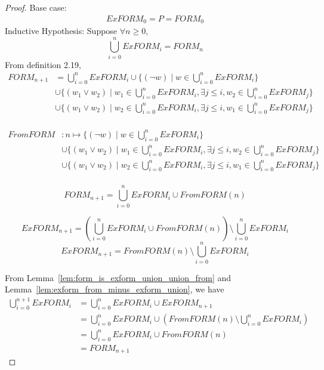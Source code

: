 \documentclass{article}
\newtheorem{definition}[theorem]{Definition}
\let\olddefinition\definition
\let\endolddefinition\enddefinition
\renewenvironment{definition}
  {\begin{tcolorbox}[
      colback=red!10,
      colframe=red!50!black,
      boxrule=0.6pt,
      arc=2pt,
      left=6pt,right=6pt,top=4pt,bottom=4pt,
      breakable
    ]\olddefinition}
  {\endolddefinition\end{tcolorbox}}
\newtheorem{lemma}[theorem]{Lemma}
\let\oldlemma\lemma
\let\endoldlemma\endlemma
\renewenvironment{lemma}
  {\begin{tcolorbox}[
      colback=green!8,
      colframe=green!50!black,
      boxrule=0.6pt,
      arc=2pt,
      left=6pt,right=6pt,top=4pt,bottom=4pt
    ]\oldlemma}
  {\endoldlemma\end{tcolorbox}}
\begin{document}
\begin{proof}
    Base case: 
    \begin{align*}
        ExFORM_0 = P = FORM_0
    \end{align*}
    Inductive Hypothesis: Suppose $\forall n \geq 0$,
    \[\bigcup_{i= 0}^{n} ExFORM_i = FORM_{n}\]
    From definition 2.19, 
    \begin{align*}
        FORM_{n+1} &= \bigcup_{i= 0}^{n}ExFORM_{i} \cup \{(\neg w) \mid w \in \bigcup_{i= 0}^{n}ExFORM_{i}\} \\
        &\cup \{(w_1 \lor w_2) \mid w_1 \in \bigcup_{i= 0}^{n}ExFORM_i, \exists j \leq i, w_2 \in \bigcup_{i= 0}^{n}ExFORM_{j}\}\\
        &\cup \{(w_1 \lor w_2) \mid w_2 \in \bigcup_{i= 0}^{n}ExFORM_i, \exists j \leq i, w_1 \in \bigcup_{i= 0}^{n}ExFORM_{j}\}\\
    \end{align*}
    \begin{definition}
        \begin{align*}
            FromFORM &: n \mapsto \{(\neg w) \mid w \in \bigcup_{i= 0}^{n}ExFORM_{i}\} \\
            &\cup \{(w_1 \lor w_2) \mid w_1 \in \bigcup_{i= 0}^{n}ExFORM_i, \exists j \leq i, w_2 \in \bigcup_{i= 0}^{n}ExFORM_{j}\}\\
            &\cup \{(w_1 \lor w_2) \mid w_2 \in \bigcup_{i= 0}^{n}ExFORM_i, \exists j \leq i, w_1 \in \bigcup_{i= 0}^{n}ExFORM_{j}\}\\
        \end{align*}
    \end{definition}
    \begin{lemma}\label{lem:form_is_exform_union_union_from}
        \[FORM_{n+1} = \bigcup_{i= 0}^{n}ExFORM_{i} \cup FromFORM(n)\]        
    \end{lemma}
    \begin{lemma}\label{lem:exform_from_minus_exform_union}
        \[ExFORM_{n+1} = (\bigcup_{i= 0}^{n}ExFORM_{i} \cup FromFORM(n)) \setminus \bigcup_{i= 0}^{n}ExFORM_{i}\]
        \[ExFORM_{n+1} = FromFORM(n) \setminus \bigcup_{i= 0}^{n}ExFORM_{i}\]
    \end{lemma}
    From Lemma~\ref{lem:form_is_exform_union_union_from} and Lemma~\ref{lem:exform_from_minus_exform_union}, we have
    \begin{align*}
        \bigcup_{i= 0}^{n+1}ExFORM_{i} &= \bigcup_{i= 0}^{n}ExFORM_{i} \cup ExFORM_{n+1}\\
        &= \bigcup_{i= 0}^{n}ExFORM_{i} \cup (FromFORM(n) \setminus \bigcup_{i= 0}^{n}ExFORM_{i})\\
        &= \bigcup_{i= 0}^{n}ExFORM_{i} \cup FromFORM(n)\\
        &= FORM_{n+1}
    \end{align*}
\end{proof}
\end{document}
